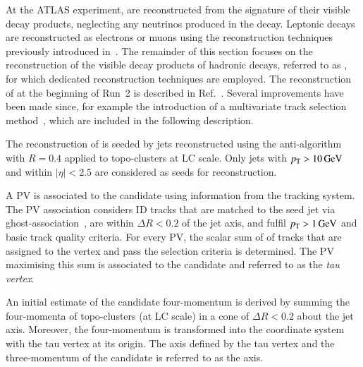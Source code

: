 At the ATLAS experiment, \tauleptons are reconstructed from the signature of
their visible decay products, neglecting any neutrinos produced in the
decay. Leptonic \taulepton decays are reconstructed as electrons or muons using
the reconstruction techniques previously introduced
in~. The remainder of this section focuses on the
reconstruction of the visible decay products of hadronic \taulepton decays,
referred to as \tauhadvis, for which dedicated reconstruction techniques are
employed. The reconstruction of \tauhadvis at the beginning of Run~2 is
described in Ref.~\cite{ATLAS-CONF-2017-029}. Several improvements have been
made since, for example the introduction of a multivariate track selection
method~\cite{duschinger}, which are included in the following description.

The reconstruction of \tauhadvis is seeded by jets reconstructed using the
anti-\kt algorithm with $R = 0.4$ applied to topo-clusters at LC scale. Only
jets with $\pT > \SI{10}{\GeV}$ and within $|\eta| < 2.5$ are considered as
seeds for \tauhadvis reconstruction.

A PV is associated to the \tauhadvis candidate using information from the
tracking system. The PV association considers ID tracks that are matched to the
seed jet via ghost-association~\cite{Cacciari:2008gn}, are within
$\Delta R < 0.2$ of the jet axis, and fulfil $\pT > \SI{1}{\GeV}$ and basic
track quality criteria. For every PV, the scalar sum of \pT of tracks that are
assigned to the vertex and pass the selection criteria is determined. The PV
maximising this sum is associated to the \tauhadvis candidate and referred to as
the \emph{tau vertex}.

An initial estimate of the \tauhadvis candidate four-momentum is derived by
summing the four-momenta of topo-clusters (at LC scale) in a cone of
$\Delta R < 0.2$ about the jet axis. Moreover, the four-momentum is transformed
into the coordinate system with the tau vertex at its origin. The axis defined
by the tau vertex and the three-momentum of the \tauhadvis candidate is referred
to as the \tauhadvis axis.

